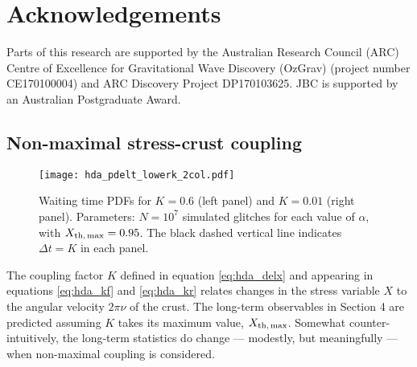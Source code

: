 \section*{Acknowledgements}
Parts of this research are supported by the Australian Research Council (ARC) Centre of Excellence for Gravitational Wave Discovery (OzGrav) (project number CE170100004) and ARC Discovery Project DP170103625. JBC is supported by an Australian Postgraduate Award.

\begin{subappendices}

\section{Non-maximal stress-crust coupling} \label{sec:hda_lowk}
\begin{figure}
\centering
\texttt{[image: hda\_pdelt\_lowerk\_2col.pdf]}
\caption{Waiting time PDFs for $K=0.6$ (left panel) and $K=0.01$ (right panel). Parameters: $N=10^7$ simulated glitches for each value of $\alpha$, with $X_{\rm th,\,max} = 0.95$. The black dashed vertical line indicates $\Delta t = K$ in each panel. \label{fig:hda_lowk}}
\end{figure}

The coupling factor $K$ defined in equation \eqref{eq:hda_delx} and appearing in equations \eqref{eq:hda_kf} and \eqref{eq:hda_kr} relates changes in the stress variable $X$ to the angular velocity $2\pi\nu$ of the crust. The long-term observables in Section 4 are predicted assuming $K$ takes its maximum value, $X_{\rm th,\,max}$. Somewhat counter-intuitively, the long-term statistics do change --- modestly, but meaningfully --- when non-maximal coupling is considered.


\end{subappendices}
